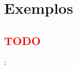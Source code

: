 \section{Exemplos}


\subsection{\textcolor{red}{TODO}}


\begin{frame}{\insertsection: \insertsubsection}


\end{frame}
